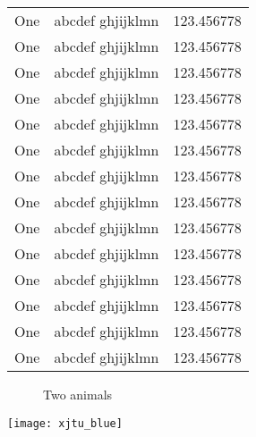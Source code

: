 \begin{ThreePartTable}
\begin{xltabular}{\linewidth}{@{}YYY@{}}
One & abcdef ghjijklmn & 123.456778 \\
One & abcdef ghjijklmn & 123.456778 \\
One & abcdef ghjijklmn & 123.456778 \\
One & abcdef ghjijklmn & 123.456778 \\
One & abcdef ghjijklmn & 123.456778 \\
One & abcdef ghjijklmn & 123.456778 \\
One & abcdef ghjijklmn & 123.456778 \\
One & abcdef ghjijklmn & 123.456778 \\
One & abcdef ghjijklmn & 123.456778 \\
One & abcdef ghjijklmn & 123.456778 \\
One & abcdef ghjijklmn & 123.456778 \\
One & abcdef ghjijklmn & 123.456778 \\
One & abcdef ghjijklmn & 123.456778 \\
One & abcdef ghjijklmn & 123.456778 \\
\bottomrule[1.5pt]
\end{xltabular}
\end{ThreePartTable}



\begin{figure}
    \centering
    \hfill

    \hfill

    \hfill
    \caption{Two animals}
    \label{1122}
\end{figure}

\begin{mdframed}
\zhlipsum
\begin{center}
    \texttt{[image: xjtu\_blue]}
\end{center}
\zhlipsum
\end{mdframed}



